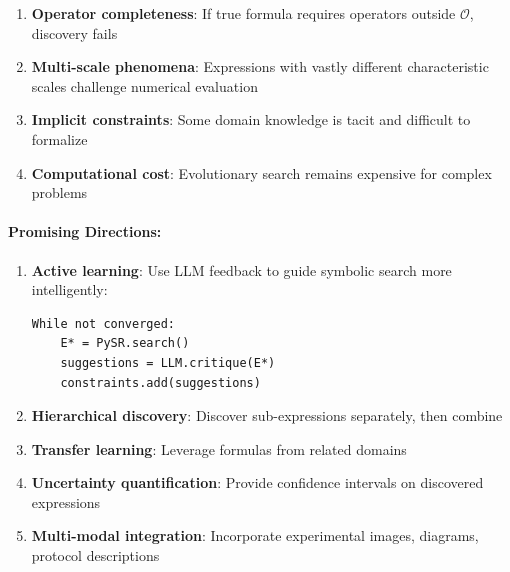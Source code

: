 \documentclass[twoside,11pt]{article}
\begin{document}
\begin{enumerate}
\item \textbf{Operator completeness}: If true formula requires operators outside $\mathcal{O}$, discovery fails
\item \textbf{Multi-scale phenomena}: Expressions with vastly different characteristic scales challenge numerical evaluation
\item \textbf{Implicit constraints}: Some domain knowledge is tacit and difficult to formalize
\item \textbf{Computational cost}: Evolutionary search remains expensive for complex problems
\end{enumerate}

\paragraph{Promising Directions:}

\begin{enumerate}
\item \textbf{Active learning}: Use LLM feedback to guide symbolic search more intelligently:
\begin{verbatim}
While not converged:
    E* = PySR.search()
    suggestions = LLM.critique(E*)
    constraints.add(suggestions)
\end{verbatim}

\item \textbf{Hierarchical discovery}: Discover sub-expressions separately, then combine
\item \textbf{Transfer learning}: Leverage formulas from related domains
\item \textbf{Uncertainty quantification}: Provide confidence intervals on discovered expressions
\item \textbf{Multi-modal integration}: Incorporate experimental images, diagrams, protocol descriptions
\end{enumerate}
\end{document}
